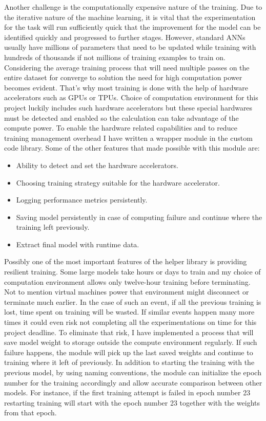 Another challenge is the computationally expensive nature of the training.
Due to the iterative nature of the machine learning, it is vital that the experimentation for the task will run sufficiently quick that the improvement for the model can be identified quickly and progressed to further stages. 
However, standard ANNs usually have millions of parameters that need to be updated while training with hundreds of thousands if not millions of training examples to train on. 
Considering the average training process that will need multiple passes on the entire dataset for converge to solution the need for high computation power becomes evident.
That's why most training is done with the help of hardware accelerators such as GPUs or TPUs.
Choice of computation environment for this project luckily includes such hardware accelerators but these special hardwares must be detected and enabled so the calculation can take advantage of the compute power.
To enable the hardware related capabilities and to reduce training management overhead I have written a wrapper module in the custom code library.
Some of the other features that made possible with this module are:

\begin{itemize}
  \item Ability to detect and set the hardware accelerators.
  \item Choosing training strategy suitable for the hardware accelerator.
  \item Logging performance metrics persistently.
  \item Saving model persistently in case of computing failure and continue where the training left previously.
  \item Extract final model with runtime data.
\end{itemize}
 
Possibly one of the most important features of the helper library is providing resilient training. 
Some large models take hours or days to train and my choice of computation environment allows only twelve-hour training before terminating. 
Not to mention virtual machines power that environment might disconnect or terminate much earlier. 
In the case of such an event, if all the previous training is lost, time spent on training will be wasted. 
If similar events happen many more times it could even risk not completing all the experimentations on time for this project deadline. 
To eliminate that risk, I have implemented a process that will save model weight to storage outside the compute environment regularly. 
If such failure happens, the module will pick up the last saved weights and continue to training where it left of previously.
In addition to starting the training with the previous model, by using naming conventions, the module can initialize the epoch number for the training accordingly and allow accurate comparison between other models. 
For instance, if the first training attempt is failed in epoch number 23 restarting training will start with the epoch number 23 together with the weights from that epoch.

